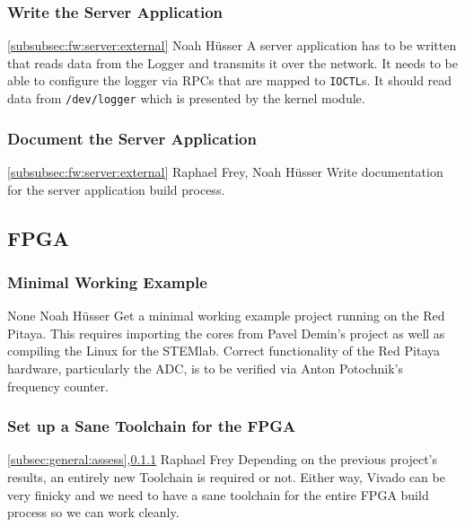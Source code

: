 \documentclass[a4paper,oneside]{alpenspecs/alpenspecs}
\begin{document}
\subsubsection{Write the Server Application}
\label{subsubsec:fw:server:server}
\wpac
    {}
    {}
    {}
    {\ref{subsubsec:fw:server:external}}
    {}
    {Noah H\"usser}
    {%
        A server application has to be written that reads data from the Logger
        and transmits it  over the network.  It needs to  be able to configure
        the logger  via RPCs  that are mapped  to \texttt{IOCTL}s.   It should
        read data from  \texttt{/dev/logger} which is presented  by the kernel
        module.
    }

\subsubsection{Document the Server Application}
\label{subsubsec:fw:server:docs}
\wpac
    {}
    {}
    {}
    {\ref{subsubsec:fw:server:external}}
    {}
    {Raphael Frey, Noah H\"usser}
    {%
        Write documentation for the server application build process.
    }

\subsection{FPGA}
\label{subsec:fw:fpga}

\subsubsection{Minimal Working Example}
\label{subsubsec:fw:fpga:mwe}
\wpac
    {}
    {}
    {}
    {None}
    {}
    {Noah H\"usser}
    {%
        Get a minimal working example project running on the Red Pitaya.  This
        requires importing  the cores  from Pavel Demin's  project as  well as
        compiling the Linux for the STEMlab.  Correct functionality of the Red
        Pitaya hardware,  particularly the  ADC, is to  be verified  via Anton
        Potochnik's frequency counter.
    }

\subsubsection{Set up a Sane Toolchain for the FPGA}
\label{subsubsec:fw:fpga:sane}

\wpac
    {}
    {}
    {}
    {\ref{subsec:general:assess},\ref{subsubsec:fw:fpga:mwe}}
    {}
    {Raphael Frey}
    {%
    Depending on the previous project's  results, an entirely new Toolchain is
    required or  not. Either way, Vivado  can be very  finicky and we  need to
    have a  sane toolchain for  the entire FPGA build  process so we  can work
    cleanly.
    }
\end{document}
